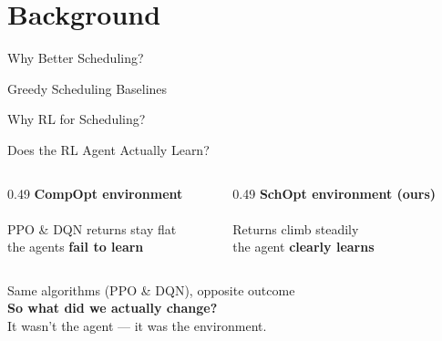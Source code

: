 \section{Background}

\begin{frame}{Why Better Scheduling?}
  \centering
  
\end{frame}

\begin{frame}{Greedy Scheduling Baselines}
  \centering
  
\end{frame}

\begin{frame}{Why RL for Scheduling?}
  \centering
  
\end{frame}

\begin{frame}{Does the RL Agent Actually Learn?}
  \begin{columns}[T]
    \begin{column}{0.49\textwidth}
      \centering
      {\bfseries\color{SoftCoral} CompOpt environment}\\[3pt]
      \\[5pt]
      {\footnotesize PPO \& DQN returns stay flat \\ the agents \textbf{fail to learn}}
    \end{column}
    \begin{column}{0.49\textwidth}
      \centering
      {\bfseries\color{SkyBlue} SchOpt environment (ours)}\\[3pt]
      \\[5pt]
      {\footnotesize Returns climb steadily \\ the agent \textbf{clearly learns}}
    \end{column}
  \end{columns}
\end{frame}

\begin{frame}
  \centering
  \vfill
  {\color{SkyBlue}\large Same algorithms (PPO \& DQN), opposite outcome}\\[1.2em]
  {\color{DeepBlue}\Huge\bfseries So what did we actually change?}\\[1.2em]
  {\color{DeepBlue!70}\normalsize It wasn't the agent --- it was the environment.}
  \vfill
\end{frame}
